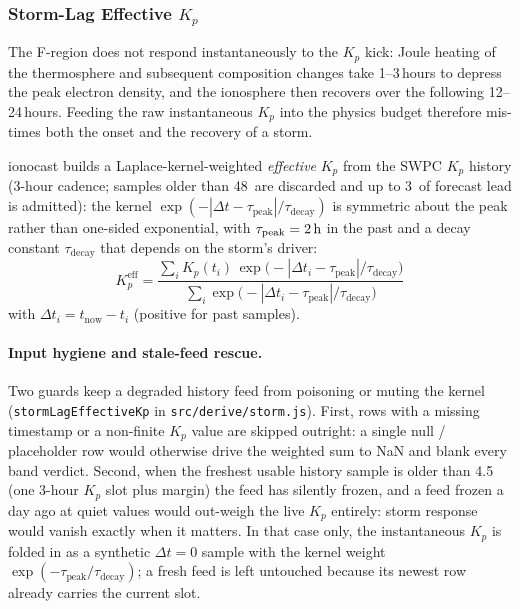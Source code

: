 \documentclass[11pt,a4paper]{article}
\newcommand{\SI}[2]{#1\,\text{#2}}
\newcommand{\hour}{\text{h}}
\begin{document}
\subsubsection{Storm-Lag Effective $K_p$}\label{sec:kplag}

The F-region does not respond instantaneously to the $K_p$ kick: Joule
heating of the thermosphere and subsequent composition changes take
1--3\,hours to depress the peak electron density, and the ionosphere
then recovers over the following 12--24\,hours.  Feeding the raw
instantaneous $K_p$ into the physics budget therefore mis-times both
the onset and the recovery of a storm.

ionocast builds a Laplace-kernel-weighted \emph{effective} $K_p$
from the SWPC $K_p$ history (3-hour cadence; samples older than
\SI{48}{\hour} are discarded and up to \SI{3}{\hour} of forecast
lead is admitted): the kernel
$\exp(-|\Delta t - \tau_{\text{peak}}|/\tau_{\text{decay}})$ is
symmetric about the peak rather than one-sided exponential, with
$\tau_{\text{peak}} = \SI{2}{\hour}$ in the past and a decay
constant $\tau_{\text{decay}}$ that depends on the storm's
driver:
\begin{equation}\label{eq:kplag}
  K_p^{\text{eff}} = \frac{
    \sum_i K_p(t_i)\,
    \exp\!\bigl(-|\Delta t_i - \tau_{\text{peak}}|/\tau_{\text{decay}}\bigr)
  }{
    \sum_i \exp\!\bigl(-|\Delta t_i - \tau_{\text{peak}}|/\tau_{\text{decay}}\bigr)
  }
\end{equation}
with $\Delta t_i = t_{\text{now}} - t_i$ (positive for past samples).

\paragraph{Input hygiene and stale-feed rescue.}  Two guards keep
a degraded history feed from poisoning or muting the kernel
(\texttt{stormLagEffectiveKp} in \texttt{src/derive/storm.js}).
First, rows with a missing timestamp or a non-finite $K_p$ value
are skipped outright: a single null / placeholder row would
otherwise drive the weighted sum to NaN and blank every band
verdict.  Second, when the freshest usable history sample is
older than \SI{4.5}{\hour} (one 3-hour $K_p$ slot plus margin)
the feed has silently frozen, and a feed frozen a day ago at
quiet values would out-weigh the live $K_p$ entirely: storm
response would vanish exactly when it matters.  In that case only,
the instantaneous $K_p$ is folded in as a synthetic
$\Delta t = 0$ sample with the kernel weight
$\exp(-\tau_{\text{peak}}/\tau_{\text{decay}})$; a fresh feed is
left untouched because its newest row already carries the current
slot.
\end{document}
